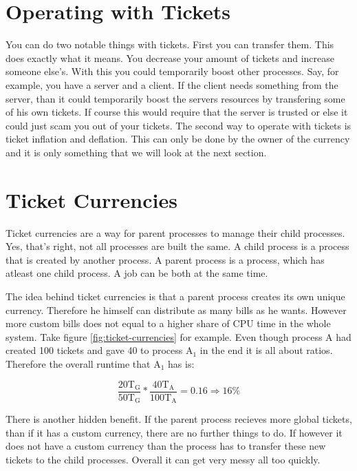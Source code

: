 \section{Operating with Tickets}

You can do two notable things with tickets. First you can transfer them. 
This does exactly what it means. You decrease your amount of tickets and increase someone else's. 
With this you could temporarily boost other processes.
Say, for example, you have a server and a client.
If the client needs something from the server, than it could temporarily boost the servers resources by transfering some of his own tickets.
If course this would require that the server is trusted or else it could just scam you out of your tickets.
The second way to operate with tickets is ticket inflation and deflation. This can only be done by the owner of the currency and it is only something that we will look at the next section.

\section{Ticket Currencies}

Ticket currencies are a way for parent processes to manage their child processes.
Yes, that's right, not all processes are built the same.
A child process is a process that is created by another process.
A parent process is a process, which has atleast one child process.
A job can be both at the same time.

The idea behind ticket currencies is that a parent process creates its own unique currency. Therefore he himself can distribute as many bills as he wants. 
However more custom bills does not equal to a higher share of CPU time in the whole system.
Take figure \ref{fig:ticket-currencies} for example. Even though process A had created 100 tickets and gave 40 to process A$_1$ in the end it is all about ratios.
Therefore the overall runtime that A$_1$ has is: 

$$\frac{20\text{T}_\text{G}}{50\text{T}_\text{G}} * \frac{40\text{T}_\text{A}}{100\text{T}_\text{A}} = 0.16 \Rightarrow 16\%$$

There is another hidden benefit. If the parent process recieves more global tickets, than if it has a custom currency, there are no further things to do.
If however it does not have a custom currency than the process has to transfer these new tickets to the child processes. Overall it can get very messy all too quickly.

